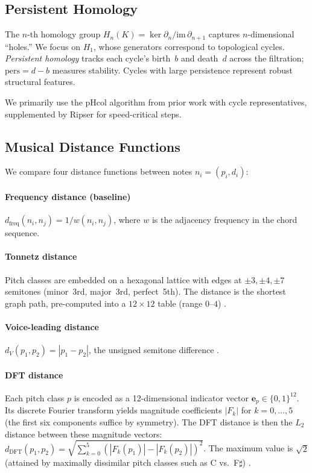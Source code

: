 \documentclass[conference,10pt,a4paper]{IEEEtran}
\begin{document}
\subsection{Persistent Homology}
\label{subsec:ph}

The $n$-th homology group $H_n(K) = \ker\partial_n / \mathrm{im}\,\partial_{n+1}$ captures $n$-dimensional ``holes.''
We focus on $H_1$, whose generators correspond to topological cycles.
\emph{Persistent homology} tracks each cycle's birth~$b$ and death~$d$
across the filtration; $\mathrm{pers} = d - b$ measures stability.
Cycles with large persistence represent robust structural features.

We primarily use the pHcol algorithm from prior work
\cite{tran2021,lee2024} with cycle representatives, supplemented
by Ripser \cite{bauer2021} for speed-critical steps.

\subsection{Musical Distance Functions}
\label{subsec:distances}

We compare four distance functions between notes $n_i = (p_i, d_i)$:

\paragraph{Frequency distance (baseline)}
$d_{\mathrm{freq}}(n_i, n_j) = 1/w(n_i, n_j)$, where $w$ is
the adjacency frequency in the chord sequence.

\paragraph{Tonnetz distance}
Pitch classes are embedded on a hexagonal lattice with edges at
$\pm 3, \pm 4, \pm 7$ semitones (minor~3rd, major~3rd, perfect~5th).
The distance is the shortest graph path, pre-computed into a
$12 \times 12$ table (range $0$--$4$) \cite{tymoczko2012}.

\paragraph{Voice-leading distance}
$d_V(p_1, p_2) = |p_1 - p_2|$, the unsigned semitone difference
\cite{tymoczko2008}.

\paragraph{DFT distance}
Each pitch class $p$ is encoded as a 12-dimensional indicator vector
$\mathbf{e}_p \in \{0,1\}^{12}$.  Its discrete Fourier transform yields
magnitude coefficients $|F_k|$ for $k = 0, \ldots, 5$ (the first six
components suffice by symmetry).  The DFT distance is then the $L_2$
distance between these magnitude vectors:
$d_{\mathrm{DFT}}(p_1,p_2) = \sqrt{\sum_{k=0}^{5}(|F_k(p_1)| - |F_k(p_2)|)^2}$.
The maximum value is $\sqrt{2}$ (attained by maximally dissimilar
pitch classes such as C vs.\ F$\sharp$) \cite{tymoczko2008}.
\end{document}
